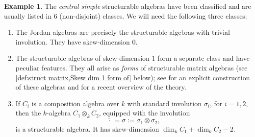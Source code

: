 \documentclass[oneside,a4paper]{amsart} %
\theoremstyle{definition}
\newtheorem{example}[theorem]{Example}
\numberwithin{equation}{section}
\begin{document}
\begin{example}
	The \textit{central simple} structurable algebras have been classified and are usually listed in 6 (non-disjoint) classes.
	We will need the following three classes:
	\begin{enumerate}
		\item The Jordan algebras are precisely the structurable algebras with trivial involution. They have skew-dimension $0$.
		\item The structurable algebras of skew-dimension $1$ form a separate class and have peculiar features. They all arise as \emph{forms} of structurable matrix algebras (see \cref{def:struct matrix,Skew dim 1 form of} below); see \cite{DeMedts2019} for an explicit construction of these algebras and for a recent overview of the theory.
		\item If $C_i$ is a composition algebra over $k$ with standard involution $\sigma_i$, for $i=1,2$, then the $k$-algebra $C_1\otimes_k C_2$, equipped with the involution 
			\[ \overline{\,\cdot\,} =\sigma := \sigma_1\otimes \sigma_2 ,\]
			is a structurable algebra.
			It has skew-dimension $\dim_k C_1 + \dim_k C_2 - 2$.
	\end{enumerate}
\end{example}
\end{document}
